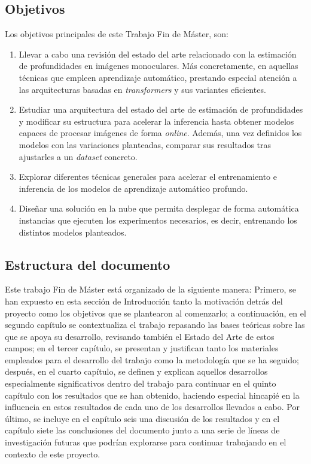 \subsection{Objetivos}
Los objetivos principales de este Trabajo Fin de Máster, son:
\begin{enumerate}
	\item Llevar a cabo una revisión del estado del arte relacionado con la estimación de profundidades en imágenes monoculares. Más concretamente, en aquellas técnicas que empleen aprendizaje automático, prestando especial atención a las arquitecturas basadas en \textit{transformers} y sus variantes eficientes.
    \item Estudiar una arquitectura del estado del arte de estimación de profundidades y modificar su estructura para acelerar la inferencia hasta obtener modelos capaces de procesar imágenes de forma \textit{online}. Además, una vez definidos los modelos con las variaciones planteadas, comparar sus resultados tras ajustarles a un \textit{dataset} concreto.
    \item Explorar diferentes técnicas generales para acelerar el entrenamiento e inferencia de los modelos de aprendizaje automático profundo. 
    \item Diseñar una solución en la nube que permita desplegar de forma automática instancias que ejecuten los experimentos necesarios, es decir, entrenando los distintos modelos planteados.
\end{enumerate}


\subsection{Estructura del documento}
Este trabajo Fin de Máster está organizado de la siguiente manera: Primero, se han expuesto en esta sección de Introducción tanto la motivación detrás del proyecto como los objetivos que se plantearon al comenzarlo; a continuación, en el segundo capítulo se contextualiza el trabajo repasando las bases teóricas sobre las que se apoya su desarrollo, revisando también el Estado del Arte de estos campos; en el tercer capítulo, se presentan y justifican tanto los materiales empleados para el desarrollo del trabajo como la metodología que se ha seguido; después, en el cuarto capítulo, se definen y explican aquellos desarrollos especialmente significativos dentro del trabajo para continuar en el quinto capítulo con los resultados que se han obtenido, haciendo especial hincapié en la influencia en estos resultados de cada uno de los desarrollos llevados a cabo. Por último, se incluye en el capítulo seis una discusión de los resultados y en el capítulo siete las conclusiones del documento junto a una serie de líneas de investigación futuras que podrían explorarse para continuar trabajando en el contexto de este proyecto. 


\clearpage
